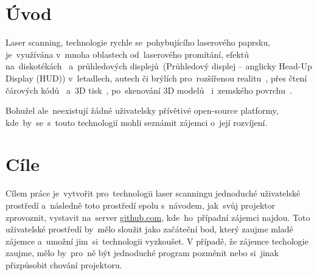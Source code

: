 \chapter*{Úvod}



Laser scanning, technologie rychle se~pohybujícího laserového paprsku, je~využívána v~mnoha oblastech od~laserového promítání, efektů na~diskotékách~\cite{laser-projection} a~průhledových displejů~(Průhledový displej -- anglicky Head-Up Display (HUD)) v~letadlech, autech či brýlích pro~rozšířenou realitu~\cite{laser-huds}, přes čtení čárových kódů~\cite{history-of-barcode-scanning} a~3D tisk~\cite{Photo-curing-3D-printing}, po~skenování 3D modelů~\cite{3d-model-scan} i~zemského povrchu~\cite{heightmaps}.

Bohužel ale~neexistují žádné uživatelsky přívětivé open-source platformy, kde~by~se~s~touto technologií mohli seznámit zájemci o~její rozvíjení.

\chapter*{Cíle}
Cílem práce je~vytvořit pro~technologii laser scanningu jednoduché uživatelské prostředí a~následně toto prostředí spolu s~návodem, jak~svůj projektor zprovoznit, vystavit na~server \url{github.com}, kde~ho~případní zájemci najdou.
Toto uživatelské prostředí by~mělo sloužit jako začáteční bod, který zaujme mladé zájemce a~umožní jim~si~technologii vyzkoušet.
V případě, že zájemce techologie zaujme, mělo by~pro~ně být jednoduché program pozměnit nebo si~jinak přizpůsobit chování projektoru.
